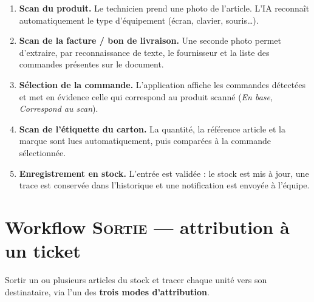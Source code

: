 \documentclass[11pt,a4paper]{article}
\begin{document}
\begin{enumerate}
  \item \textbf{Scan du produit.} Le technicien prend une photo de
        l'article. L'IA reconnaît automatiquement le type d'équipement
        (écran, clavier, souris\dots).
  \item \textbf{Scan de la facture / bon de livraison.} Une seconde
        photo permet d'extraire, par reconnaissance de texte, le
        fournisseur et la liste des commandes présentes sur le document.
  \item \textbf{Sélection de la commande.} L'application affiche les
        commandes détectées et met en évidence celle qui correspond au
        produit scanné (\emph{En base}, \emph{Correspond au scan}).
  \item \textbf{Scan de l'étiquette du carton.} La quantité, la
        référence article et la marque sont lues automatiquement, puis
        comparées à la commande sélectionnée.
  \item \textbf{Enregistrement en stock.} L'entrée est validée : le
        stock est mis à jour, une trace est conservée dans l'historique
        et une notification est envoyée à l'équipe.
\end{enumerate}

\begin{center}
\end{center}

\section{Workflow \textsc{Sortie} — attribution à un ticket}

\begin{infobox}[Objectif]
Sortir un ou plusieurs articles du stock et tracer chaque unité vers
son destinataire, via l'un des \textbf{trois modes d'attribution}.
\end{infobox}
\end{document}
